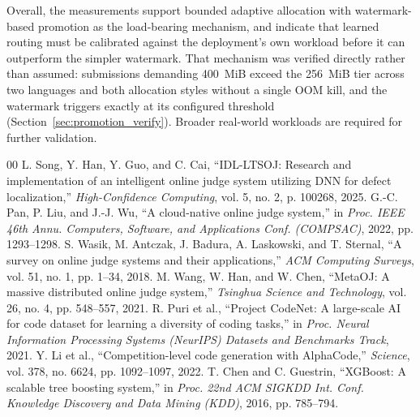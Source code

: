 \documentclass[conference]{IEEEtran}
\begin{document}
Overall, the measurements support bounded adaptive allocation with watermark-based promotion as the load-bearing mechanism, and indicate that learned routing must be calibrated against the deployment's own workload before it can outperform the simpler watermark. That mechanism was verified directly rather than assumed: submissions demanding 400~MiB exceed the 256~MiB tier across two languages and both allocation styles without a single OOM kill, and the watermark triggers exactly at its configured threshold (Section~\ref{sec:promotion_verify}). Broader real-world workloads are required for further validation.


{\scriptsize
\begin{thebibliography}{00}
 L. Song, Y. Han, Y. Guo, and C. Cai, ``IDL-LTSOJ: Research and implementation of an intelligent online judge system utilizing DNN for defect localization,'' \textit{High-Confidence Computing}, vol. 5, no. 2, p. 100268, 2025.
 G.-C. Pan, P. Liu, and J.-J. Wu, ``A cloud-native online judge system,'' in \textit{Proc. IEEE 46th Annu. Computers, Software, and Applications Conf. (COMPSAC)}, 2022, pp. 1293--1298.
 S. Wasik, M. Antczak, J. Badura, A. Laskowski, and T. Sternal, ``A survey on online judge systems and their applications,'' \textit{ACM Computing Surveys}, vol. 51, no. 1, pp. 1--34, 2018.
 M. Wang, W. Han, and W. Chen, ``MetaOJ: A massive distributed online judge system,'' \textit{Tsinghua Science and Technology}, vol. 26, no. 4, pp. 548--557, 2021.
 R. Puri et al., ``Project CodeNet: A large-scale AI for code dataset for learning a diversity of coding tasks,'' in \textit{Proc. Neural Information Processing Systems (NeurIPS) Datasets and Benchmarks Track}, 2021.
 Y. Li et al., ``Competition-level code generation with AlphaCode,'' \textit{Science}, vol. 378, no. 6624, pp. 1092--1097, 2022.
 T. Chen and C. Guestrin, ``XGBoost: A scalable tree boosting system,'' in \textit{Proc. 22nd ACM SIGKDD Int. Conf. Knowledge Discovery and Data Mining (KDD)}, 2016, pp. 785--794.
\end{thebibliography}
}
\end{document}
